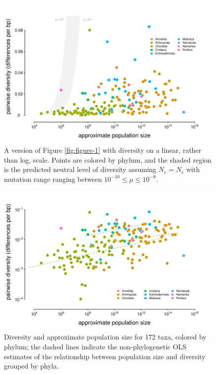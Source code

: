 \documentclass[11pt]{article}
\begin{document}
\begin{figure}[!htb]
  \centering
  \includegraphics[width=\textwidth]{figures/diversity_popsize_linear.pdf}

  \caption{A version of Figure \ref{fig:figure-1} with diversity on a linear,
    rather than log, scale. Points are colored by phylum, and the shaded region
    is the predicted neutral level of diversity assuming $N_e = N_c$ with mutation
  range ranging between $10^{-10} \le \mu \le 10^{-8}$. }

  \label{suppfig:figure-1-linear}
\end{figure}



\begin{figure}[!htb]
  \centering
  \includegraphics[width=\textwidth]{figures/diversity_popsize_averages.pdf}

  \caption{Diversity and approximate population size for 172 taxa, colored by
    phylum; the dashed lines indicate the non-phylogenetic OLS estimates of the
  relationship between population size and diversity grouped by phyla.}

  \label{suppfig:figure-1-ave}
\end{figure}
\end{document}
